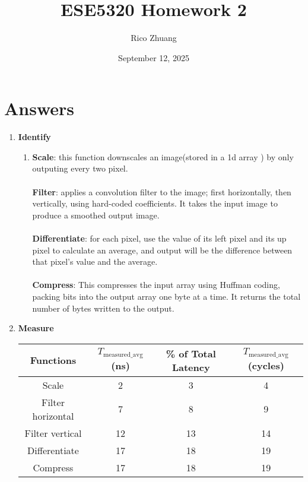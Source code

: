 \documentclass[12pt]{article}
\title{ESE5320 Homework 2}
\author{Rico Zhuang}
\date{September 12, 2025}
\begin{document}
\maketitle

\section*{Answers}

\begin{enumerate}
    \item \textbf{Identify}
    \begin{enumerate}[label=\arabic*)]
        \item \textbf{Scale}: this function downscales an image(stored in a 1d array ) by only outputing every two pixel.
        \\\\ \textbf{Filter}: applies a convolution filter to the image; first horizontally, then vertically, using hard-coded coefficients. It takes the input image to produce a smoothed output image.
        \\\\ \textbf{Differentiate}: for each pixel, use the value of its left pixel and its up pixel to calculate an average, and output will be the difference between that pixel's value and the average.
        \\\\ \textbf{Compress}: This compresses the input array using Huffman coding, packing bits into the output array one byte at a time. It returns the total number of bytes written to the output.


    \end{enumerate}

    \item  \textbf{Measure}


        \begin{tabular}{|c|c|c|c|}
        \hline
        Functions & $T_{\text{measured\_avg}}$(ns) & \% of Total Latency & $T_{\text{measured\_avg}}$(cycles) \\
        \hline
        Scale & 2 & 3 & 4\\
        \hline
        Filter horizontal & 7 & 8 & 9\\
        \hline
        Filter vertical & 12 & 13 & 14\\
        \hline
        Differentiate & 17 & 18 & 19\\
        \hline
        Compress & 17 & 18 & 19\\
        \hline


\end{tabular}
\end{enumerate}
\end{document}
